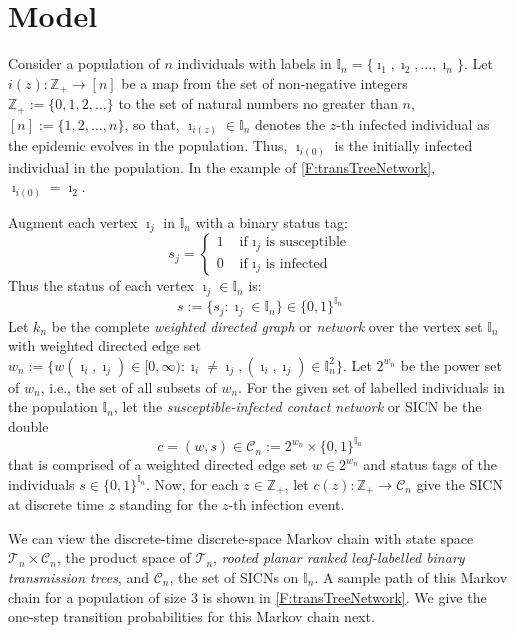 \documentclass[review]{elsarticle}
\numberwithin{equation}{section}
\let\orgautoref\autoref
\renewcommand{\autoref}
        {\def\equationautorefname{Eq.}%
         \def\figureautorefname{Fig.}%
         \def\subfigureautorefname{Fig.}%
         \def\sectionautorefname{Sect.}%
         \def\subsectionautorefname{Sect.}%
         \def\subsubsectionautorefname{Sect.}%
         \def\Itemautorefname{item}%
         \def\tableautorefname{Table}%
         \def\propositionautorefname{Prop.}%
         \def\corollaryautorefname{Corollary}%
         \def\theoremautorefname{Theorem}%
         \def\remarkautorefname{Remark}%
         \def\lemmaautorefname{Lemma}%
         \def\proofofautorefname{Proof}%
         \def\exampleautorefname{Example}%
         \orgautoref}
\newcommand{\bZ}{{\mathbb Z}}
\newcommand{\bI}{{\mathbb I}}
\begin{document}
\section{Model}\label{S:Model}

Consider a population of $n$ individuals with labels in $\bI_n = \{\imath_1, \imath_2, \ldots, \imath_n\}$.  
Let $i(z):\bZ_+ \to [n]$ be a map from the set of non-negative integers $\bZ_+:=\{0,1,2,\ldots\}$ to the set of natural numbers no greater than $n$, $[n]:=\{1,2,\ldots,n\}$, 
so that, $\imath_{i(z)} \in \bI_n$ denotes the $z$-th infected individual as the epidemic evolves in the population.
Thus, $\imath_{i(0)}$ is the initially infected individual in the population.  
In the example of \autoref{F:transTreeNetwork}, $\imath_{i(0)} = \imath_2$.  

Augment each vertex $\imath_j$ in $\bI_n$ with a binary status tag:
\[
s_j = 
\begin{cases}
1 & \text{ if  $\imath_j$ is susceptible}\\
0 & \text{ if  $\imath_j$ is infected}
\end{cases}
\]
Thus the status of each vertex $\imath_j \in \bI_n$ is:
\[
s := \{s_j: \imath_j \in \bI_n\} \in \{0,1\}^{\bI_n}
\]
Let $k_n$ be the complete {\em weighted directed graph} or {\em network} over the vertex set $\bI_n$ with weighted directed edge set $w_n := \{w(\imath_i,\imath_j) \in [0,\infty): \imath_i \neq \imath_j, (\imath_i, \imath_j) \in \bI_n^2\}$.  
Let $2^{w_n}$ be the power set of $w_n$, i.e., the set of all subsets of $w_n$.  
For the given set of labelled individuals in the population $\bI_n$, 
let the {\em susceptible-infected contact network} or SICN be the double 
\[c = (w,s) \in \mathcal{C}_n := 2^{w_n} \times \{0,1\}^{\bI_n}\]
that is comprised of a weighted directed edge set $w \in 2^{w_n}$ and status tags of the individuals $s\in \{0,1\}^{\bI_n}$.  
Now, for each $z \in \bZ_+$, let $c(z): \bZ_+ \to \mathcal{C}_n$ give the SICN at discrete time $z$ standing for the $z$-th infection event.

We can view the discrete-time discrete-space Markov chain with state space $\mathcal{T}_n \times \mathcal{C}_n$, the product space of $\mathcal{T}_n$, {\em rooted planar ranked leaf-labelled binary transmission trees}, and $\mathcal{C}_n$, the set of SICNs on $\bI_n$.  
A sample path of this Markov chain for a population of size $3$ is shown in \autoref{F:transTreeNetwork}.  We give the one-step transition probabilities for this Markov chain next. 
\end{document}
